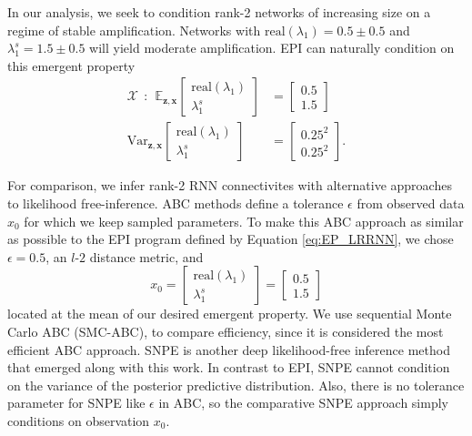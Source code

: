 \documentclass[11pt]{article}
\begin{document}
In our analysis, we seek to condition rank-2 networks of increasing size on a regime of stable amplification.  
Networks with $\text{real}(\lambda_1) = 0.5 \pm 0.5$ and $\lambda_1^s = 1.5 \pm 0.5$ will yield moderate amplification.
 EPI can naturally condition on this emergent property
\begin{equation}\label{eq:EP_LRRNN}
\begin{split}
\mathcal{X} ~~:~~ \mathbb{E}_{\mathbf{z}, \mathbf{x}} \begin{bmatrix} \text{real}(\lambda_1) \\ \lambda^s_1 \end{bmatrix} &= \begin{bmatrix} 0.5 \\ 1.5 \end{bmatrix} \\
\text{Var}_{\mathbf{z}, \mathbf{x}} \begin{bmatrix} \text{real}(\lambda_1) \\ \lambda^s_1 \end{bmatrix} &= \begin{bmatrix} 0.25^2 \\ 0.25^2 \end{bmatrix} .
\end{split}
\end{equation}

For comparison, we infer rank-2 RNN connectivites with alternative approaches to likelihood free-inference.
ABC methods define a tolerance $\epsilon$ from observed data $x_0$ for which we keep sampled parameters.
To make this ABC approach as similar as possible to the EPI program defined by Equation \ref{eq:EP_LRRNN}, we chose $\epsilon = 0.5$, an $l$-$2$ distance metric, and 
\begin{equation}\label{eq:SNPE_stab_amp_x0}
x_0 = \begin{bmatrix} \text{real}(\lambda_1) \\ \lambda^s_1 \end{bmatrix} = \begin{bmatrix} 0.5 \\ 1.5 \end{bmatrix}
\end{equation}
located at the mean of our desired emergent property.
We use sequential Monte Carlo ABC (SMC-ABC), to compare efficiency, since it is considered the most efficient ABC approach.
SNPE \cite{gonccalves2019training} is another deep likelihood-free inference method that emerged along with this work.
In contrast to EPI, SNPE cannot condition on the variance of the posterior predictive distribution. 
Also, there is no tolerance parameter for SNPE like $\epsilon$ in ABC, so the comparative SNPE approach simply conditions on observation $x_0$.
\end{document}
